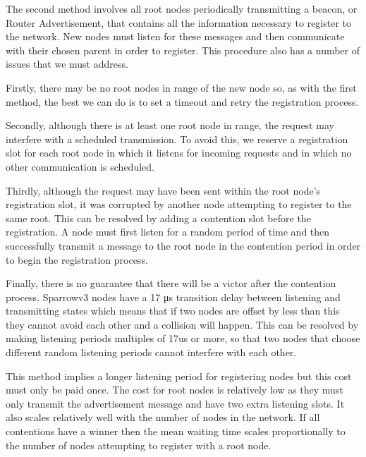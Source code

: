 The second method involves all root nodes periodically transmitting a beacon,
or Router Advertisement, that contains all the information necessary to
register to the network. New nodes must listen for these messages and then
communicate with their chosen parent in order to register. This procedure also has
a number of issues that we must address.

Firstly, there may be
no root nodes in range of the new node so, as with the first method, the best we can do is to set
a timeout and retry the registration process.

Secondly, although there is at least
one root node in range, the request may interfere with a scheduled
transmission. To avoid this, we reserve a registration slot for each root node
in which it listens for incoming requests and in which no other communication is
scheduled.

Thirdly, although the request may have been sent within the root
node's registration slot, it was corrupted by another node attempting to
register to the same root. This can be resolved by adding a contention slot
before the registration. A node must first listen for a random period of time
and then successfully transmit a message to the root node in the contention
period in order to begin the registration process.

Finally, there is no
guarantee that there will be a victor after the contention process. Sparrowv3
nodes have a 17 μs transition delay between listening and transmitting states
which means that if two nodes are offset by less than this they cannot avoid
each other and a collision will happen. This can be resolved by making
listening periods multiples of 17us or more, so that two nodes that choose 
different random listening periods cannot interfere with each other.

This method implies a longer listening period for registering nodes but this
cost must only be paid once. The cost for root nodes is relatively low as they
must only transmit the advertisement message and have two extra listening
slots. It also scales relatively well with the number of nodes in the network.
If all contentions have a winner then the mean waiting time scales
proportionally to the number of nodes attempting to register with a root node. 

\vspace{\baselineskip}

